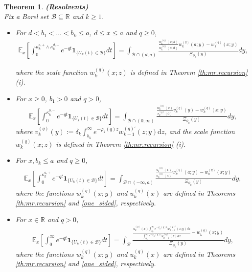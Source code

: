 \documentclass[12pt,reqno]{amsart}
\newcommand{\red}{\textcolor[rgb]{1.00,0.00,0.00}}
\newtheorem{theorem}{Theorem}
\theoremstyle{definition}
\theoremstyle{remark}
\newcommand{\e}{\mathbb{E}}
\newcommand{\ind}{\mathbf{1}}
\newcommand{\md}{\mathrm{d}}
\newcommand{\wq}{w^{(q)}}
\begin{document}
\begin{theorem}{\textbf{(Resolvents)}}\label{Resolvents}\\
Fix a Borel set $\mathcal{B} \subseteq \mathbb{R}$ and $k \geq 1$. %


\begin{itemize}
\item[(i)] For $d < b_1<\dots< b_k\leq a$, $d \leq x \leq a$ and $q \geq 0$, 
\begin{align}\label{resolvent1}
\e_x\left[\int_0^{\kappa_k^{a,+}\wedge \kappa_k^{d,-}}e^{-qt}\ind_{\{U_k(t)\in \mathcal{B}\}}dt\right]
= \int_{\mathcal{B} \cap (d, a)} \frac{ \frac{w_k^{(q)}(x;d)}{w_k^{(q)}(a;d)}w_k^{(q)}(a;y)-w_k^{(q)}(x;y)}{ \Xi_{\phi_k}(y)} dy,
\end{align}

where the scale function $\wq_{k}(x;z)$ is defined in Theorem \ref{th:mr.recursion} (i).
\item[(ii)] For $x \geq 0$, $b_1>0$ and $q > 0$,
\begin{align}\label{resolvent2}
\e_x\left[\int_0^{\kappa_k^{0,-}}e^{-qt}\ind_{\{U_k(t)\in \mathcal{B}\}}dt\right]
= \int_{\mathcal{B} \cap (0, \infty)} \frac{\frac{w_k^{(q)}(x)}{v_k^{(q)}(0)}v_k^{(q)}(y)-w_k^{(q)}(x;y)}
{\Xi_{\phi_k}(y)} dy,
\end{align}
where $v_{k}^{(q)}(y):=\delta_{k}\int^{\infty}_{b_{k}}e^{-\varphi_k(q)z}w_{k-1}^{(q)\prime}(z;y)\md z$, and the scale function
 $\wq_{k}(x;z)$ is defined in Theorem \ref{th:mr.recursion} (i).
\item[(iii)] For  $ x, b_k \leq a$ and $q \geq 0$, %
	\begin{align}\label{resolvent3}
		\e_x\left[\int_0^{\kappa_k^{a,+}}e^{-qt}\ind_{\{U_k(t)\in \mathcal{B}\}}dt\right]
		=\int_{\mathcal{B} \cap (-\infty,a)} \frac{\frac{u_k^{(q)}(x)}{u_k^{(q)}(a)}w_k^{(q)}(a;y)-w_k^{(q)}(x;y)}
		{\Xi_{\phi_k}(y)} dy,
	\end{align}
	where the functions $w_k^{(q)}(x;y)$ and $u_k^{(q)}(x)$ are defined in Theorems \ref{th:mr.recursion} and \ref{one_sided}, respectively.
\item[(iv)] For $ x \in \mathbb{R}$ and $q > 0$,
	\begin{align}\label{resolvent4}
		\e_x\left[\int_0^{\infty}e^{-qt}\ind_{\{U_k(t)\in \mathcal{B}\}}dt\right]
		= \int_{\mathcal{B} }  \frac{\frac{u_k^{(q)}(x) \int_{b_k}^{\infty} e^{-\varphi_k(q)z} w_{k-1}^{(q)\prime}(z;y) dz  }
		{\int_{b_k}^{\infty} e^{-\varphi_k(q)z} u_{k-1}^{(q)\prime}(z) dz }-w_k^{(q)}(x;y)}
		{\Xi_{\phi_k}(y)} dy,
	\end{align}
where the functions $w_k^{(q)}(x;y)$ and $u_k^{(q)}(x)$ are defined in Theorems \ref{th:mr.recursion} and \ref{one_sided}, respectively. 
\end{itemize}
	\end{theorem}
\end{document}

